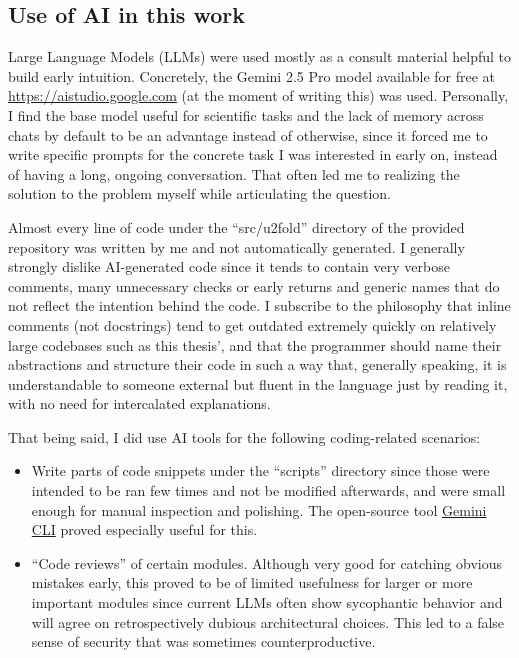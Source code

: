 \documentclass[twocolumn,twoside,a4paper,10pt]{IEEEtran}
\begin{document}
\subsection{Use of AI in this work}
Large Language Models (LLMs) were used mostly as a consult material helpful to build early intuition. Concretely, the Gemini 2.5 Pro model available for free at \href{https://aistudio.google.com}{https://aistudio.google.com} (at the moment of writing this) was used. Personally, I find the base model useful for scientific tasks and the lack of memory across chats by default to be an advantage instead of otherwise, since it forced me to write specific prompts for the concrete task I was interested in early on, instead of having a long, ongoing conversation. That often led me to realizing the solution to the problem myself while articulating the question.

Almost every line of code under the ``src/u2fold'' directory of the provided repository was written by me and not automatically generated. I generally strongly dislike AI-generated code since it tends to contain very verbose comments, many unnecessary checks or early returns and generic names that do not reflect the intention behind the code. I subscribe to the philosophy that inline comments (not docstrings) tend to get outdated extremely quickly on relatively large codebases such as this thesis', and that the programmer should name their abstractions and structure their code in such a way that, generally speaking, it is understandable to someone external but fluent in the language just by reading it, with no need for intercalated explanations.

That being said, I did use AI tools for the following coding-related scenarios:
\begin{itemize}
  \item Write parts of code snippets under the ``scripts'' directory since those were intended to be ran few times and not be modified afterwards, and were small enough for manual inspection and polishing. The open-source tool \href{https://github.com/google-gemini/gemini-cli}{Gemini CLI} proved especially useful for this.
  \item ``Code reviews'' of certain modules. Although very good for catching obvious mistakes early, this proved to be of limited usefulness for larger or more important modules since current LLMs often show sycophantic behavior and will agree on retrospectively dubious architectural choices. This led to a false sense of security that was sometimes counterproductive.
\end{itemize}
\end{document}
